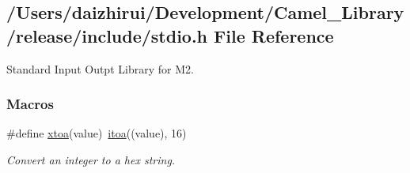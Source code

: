 \hypertarget{a00026}{}\subsection{/\+Users/daizhirui/\+Development/\+Camel\+\_\+\+Library/release/include/stdio.h File Reference}
\label{a00026}


Standard Input Outpt Library for M2.  


\subsubsection*{Macros}
\begin{DoxyCompactItemize}
\item 
\#define \mbox{\hyperlink{a00026_a3b4b01e5fa94dded508adde4ca7e5ce5}{xtoa}}(value)~\mbox{\hyperlink{a00026_ac399b37e5355c704e130b1c6f60b71ec}{itoa}}((value), 16)
\begin{DoxyCompactList}\small\item\em Convert an integer to a hex string. \end{DoxyCompactList}\end{DoxyCompactItemize}
